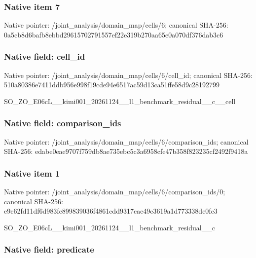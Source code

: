 \documentclass[10pt,a4paper]{article}
\begin{document}
\subsubsection{Native item 7}


Native pointer: /joint\_analysis/domain\_map/cells/6; canonical SHA-256: 0a5cb8d6bafb8ebbd2961570\allowbreak{}2791557ef22e319b270aa65e\allowbreak{}0a070df376dab3c6



\subsubsection{Native field: cell\_id}


Native pointer: /joint\_analysis/domain\_m\allowbreak{}ap/cells/6/cell\_id; canonical SHA-256: 510a80386e7411ddb956e998\allowbreak{}f19cde94e6517ac59d13ca51\allowbreak{}ffe58d9c28192799


SO\_ZO\_E06cL\_\_kimi001\_202\allowbreak{}61124\_\_l1\_benchmark\_resi\allowbreak{}dual\_\_c\_\_cell


\subsubsection{Native field: comparison\_ids}


Native pointer: /joint\_analysis/domain\_m\allowbreak{}ap/cells/6/comparison\_id\allowbreak{}s; canonical SHA-256: edabe0eae9707f759db8ae73\allowbreak{}5ebc5c3a6958cfe47b358f82\allowbreak{}3235cf2492f9418a



\subsubsection{Native item 1}


Native pointer: /joint\_analysis/domain\_m\allowbreak{}ap/cells/6/comparison\_id\allowbreak{}s/0; canonical SHA-256: e9c62fd11df6d983fe899839\allowbreak{}036f4861cdd9317cae49c361\allowbreak{}9a1d773338de0fe3


SO\_ZO\_E06cL\_\_kimi001\_202\allowbreak{}61124\_\_l1\_benchmark\_resi\allowbreak{}dual\_\_c


\subsubsection{Native field: predicate}
\end{document}
